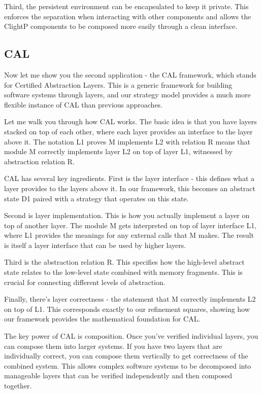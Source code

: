 \documentclass{article}
\begin{document}
Third, the persistent environment can be encapsulated to keep it private. This
enforces the separation when interacting with other components and allows the
ClightP components to be composed more easily through a clean interface.

\subsection{CAL}

Now let me show you the second application - the CAL framework, which stands for
Certified Abstraction Layers. This is a generic framework for building software
systems through layers, and our strategy model provides a much more flexible
instance of CAL than previous approaches.

Let me walk you through how CAL works. The basic idea is that you have layers
stacked on top of each other, where each layer provides an interface to the
layer above it. The notation L1 proves M implements L2 with relation R means
that module M correctly implements layer L2 on top of layer L1, witnessed by
abstraction relation R.

CAL has several key ingredients. First is the layer interface - this defines
what a layer provides to the layers above it. In our framework, this becomes an
abstract state D1 paired with a strategy that operates on this state.

Second is layer implementation. This is how you actually implement a layer on
top of another layer. The module M gets interpreted on top of layer interface
L1, where L1 provides the meanings for any external calls that M makes. The
result is itself a layer interface that can be used by higher layers.

Third is the abstraction relation R. This specifies how the high-level abstract
state relates to the low-level state combined with memory fragments. This is
crucial for connecting different levels of abstraction.

Finally, there's layer correctness - the statement that M correctly implements
L2 on top of L1. This corresponds exactly to our refinement squares, showing how
our framework provides the mathematical foundation for CAL.

The key power of CAL is composition. Once you've verified individual layers, you
can compose them into larger systems. If you have two layers that are
individually correct, you can compose them vertically to get correctness of the
combined system. This allows complex software systems to be decomposed into
manageable layers that can be verified independently and then composed together.
\end{document}
